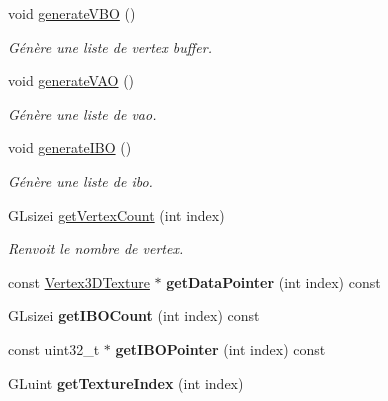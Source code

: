 \begin{DoxyCompactItemize}
void \hyperlink{classglimac_1_1CubeList_a7fc99dde6285a3b0ffc14b86f9844edc}{generate\+V\+BO} ()
\begin{DoxyCompactList}\small\item\em Génère une liste de vertex buffer. \end{DoxyCompactList}\item 
void \hyperlink{classglimac_1_1CubeList_a098351d44d9b56a3ca3f4643a0dec302}{generate\+V\+AO} ()
\begin{DoxyCompactList}\small\item\em Génère une liste de vao. \end{DoxyCompactList}\item 
void \hyperlink{classglimac_1_1CubeList_a179fb745e2097440a88f6818a14a457e}{generate\+I\+BO} ()
\begin{DoxyCompactList}\small\item\em Génère une liste de ibo. \end{DoxyCompactList}\item 
G\+Lsizei \hyperlink{classglimac_1_1CubeList_aba84c9ac9d87bedca07244b8d4525c1d}{get\+Vertex\+Count} (int index)
\begin{DoxyCompactList}\small\item\em Renvoit le nombre de vertex. \end{DoxyCompactList}\item 
\mbox{\label{classglimac_1_1CubeList_a990f5d349a4b6fd690f8b61d0ebacd7f}} 
const \hyperlink{structglimac_1_1Vertex3DTexture}{Vertex3\+D\+Texture} $\ast$ {\bfseries get\+Data\+Pointer} (int index) const
\item 
\mbox{\label{classglimac_1_1CubeList_a317ef23831d1ec198f69586bcd5fa749}} 
G\+Lsizei {\bfseries get\+I\+B\+O\+Count} (int index) const
\item 
\mbox{\label{classglimac_1_1CubeList_af52e02f29a9b4a13418cf4e90eec2562}} 
const uint32\+\_\+t $\ast$ {\bfseries get\+I\+B\+O\+Pointer} (int index) const
\item 
\mbox{\label{classglimac_1_1CubeList_a5be943e092e11ae9a2b4f045cc368bc0}} 
G\+Luint {\bfseries get\+Texture\+Index} (int index)
\item 
\mbox{\label{classglimac_1_1CubeList_ae016eb0b09350a67129d265aad1ba62e}} 

\end{DoxyCompactItemize}
